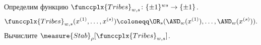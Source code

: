 Определим функцию $\funccplx{Tribes}_{w, s}\colon \{\pm 1\}^{w s} \to \{\pm 1\}$.
$$
    \funccplx{Tribes}_{w, s}(x^{(1)}, \dots, x^{(s)}) \coloneqq  \OR_{s}(\AND_w(x^{(1)}), \dots,
    \AND_w(x^{(s)})).
$$
Вычислите $\measure{Stab}_{\rho}[\funccplx{Tribes}_{w, s}]$. 